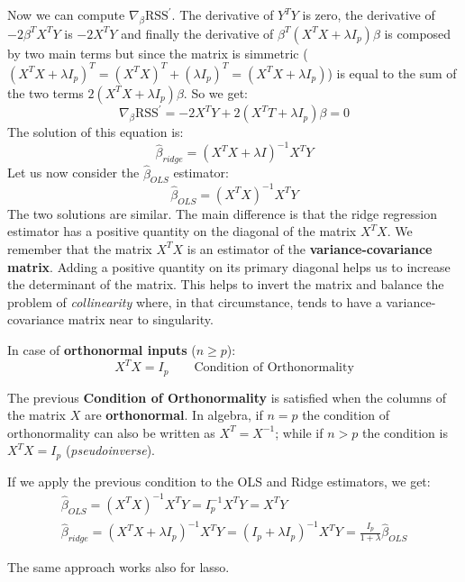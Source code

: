 Now we can compute $\nabla_\beta \text{RSS}^{\prime} $. The derivative of $Y^T Y$ is zero, the derivative of $- 2 \beta^T X^T Y $ is $- 2 X^T Y $ and finally the derivative of $\beta^T (X^T X + \lambda I_p) \beta$ is composed by two main terms but since the matrix is simmetric ($(X^TX+\lambda I_p)^T=(X^TX)^T+(\lambda I_p)^T=(X^TX+\lambda I_p)$) is equal to the sum of the two terms $2(X^T X + \lambda I_p) \beta$. So we get:
\[
    \nabla_\beta\text{RSS}^{\prime} = - 2X^T Y + 2(X^T T + \lambda I_p) \beta = 0
\]
The solution of this equation is:
\[
    \hat{\beta}_{ridge} = (X^T X + \lambda I)^{-1} X^T Y
\]
Let us now consider the $\hat{\beta}_{OLS}$ estimator:
\[
    \hat{\beta}_{OLS} = (X^T X)^{-1} X^T Y
\]
The two solutions are similar. 
The main difference is that the ridge regression estimator has a positive quantity on the diagonal of the matrix $X^T X$.
We remember that the matrix $X^T X$ is an estimator of the \textbf{variance-covariance matrix}.
Adding a positive quantity on its primary diagonal helps us to increase the determinant of the matrix. This helps to invert the matrix and balance the problem of \textit{collinearity} where, in that circumstance, tends to have a variance-covariance matrix near to singularity.

In case of \textbf{orthonormal inputs} ($n \geq p$):
\[
    X^T X = I_p \qquad \text{Condition of Orthonormality}
\]

The previous \textbf{Condition of Orthonormality} is satisfied when the columns of the matrix $X$ are \textbf{orthonormal}. 
In algebra, if $n = p$ the condition of orthonormality can also be written as $X^T = X^{-1}$; while if $n > p$ the condition is $X^T X = I_p$ (\textit{pseudoinverse}).

If we apply the previous condition to the OLS and Ridge estimators, we get:
\begin{gather*}
    \hat{\beta}_{OLS} = (X^T X)^{-1} X^T Y = I_p^{-1} X^T Y = X^T Y \\
    \hat{\beta}_{ridge} = (X^TX + \lambda I_p)^{-1}X^T Y = (I_p + \lambda I_p)^{-1} X^T Y = \frac{I_p}{1+\lambda} \hat{\beta}_{OLS}
\end{gather*}

The same approach works also for lasso.